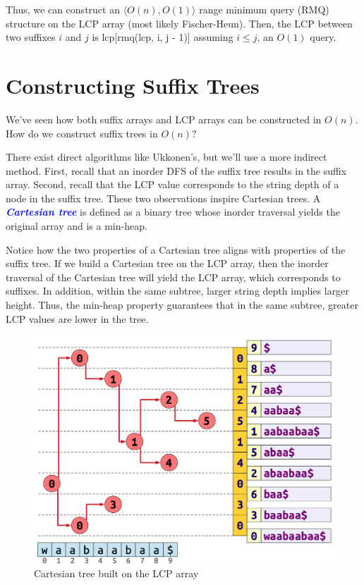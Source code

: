 \documentclass[11pt, oneside]{article}
\newcommand{\emphasis}[1]{\textcolor{blue}{\textbf{\textit{#1}}}}
\begin{document}
Thus, we can construct an \( \langle O(n), O(1) \rangle \) range minimum query (RMQ) structure
on the LCP array (most likely Fischer-Heun).
Then, the LCP between two suffixes \( i \) and \( j \) is lcp[rmq(lcp, i, j - 1)] assuming \( i \leq j \), an \( O(1) \) query.

\section{Constructing Suffix Trees}

We've seen how both suffix arrays and LCP arrays can be constructed in \( O(n) \). \\
How do we construct suffix trees in \( O(n) \)?

There exist direct algorithms like Ukkonen’s, but we'll use a more indirect method.
First, recall that an inorder DFS of the suffix tree results in the suffix array.
Second, recall that the LCP value corresponds to the string depth of a node in the suffix tree.
These two observations inspire Cartesian trees.
A \emphasis{Cartesian tree} is defined as a binary tree whose inorder traversal yields the original array and is a min-heap.

Notice how the two properties of a Cartesian tree aligns with properties of the suffix tree.
If we build a Cartesian tree on the LCP array, then the inorder traversal of the Cartesian tree
will yield the LCP array, which corresponds to suffixes.
In addition, within the same subtree, larger string depth implies larger height.
Thus, the min-heap property guarantees that in the same subtree, greater LCP values are lower in the tree.

\begin{figure}[h!]
\centering
\includegraphics[scale=0.19]{cartesian}
\caption{Cartesian tree built on the LCP array}
\end{figure}
\end{document}
